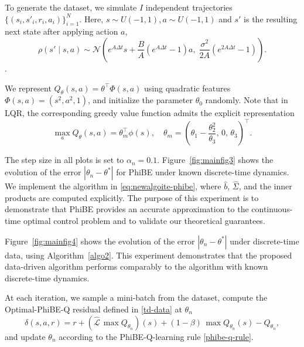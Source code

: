 \documentclass[12pt]{article}
\def\th{\theta}
\def\th{\theta}
\begin{document}
To generate the dataset, we simulate $I$ independent trajectories $\{(s_i, s'_i, r_i,a_i)\}_{i=1}^N$.
Here, $s \sim U(-1,1), a \sim U(-1,1)$ and $s'$ is the resulting next state after applying action $a$,
\[
\rho(s' \mid s,a) \sim \mathcal{N}\!\left(e^{A \Delta t}s + \frac{B}{A}\!\left(e^{A \Delta t}-1\right)a,\; \frac{\sigma^2}{2A}\!\left(e^{2A \Delta t}-1\right)\right).
\].

We represent $Q_\th(s,a) = \th^\top \Phi(s,a)$ using quadratic features $\Phi(s,a) = (s^2, a^2, 1)$, and initialize the parameter $\theta_0$ randomly. Note that in LQR, the corresponding greedy value function admits the explicit representation
\[
\max_a Q_\theta(s,a)
=
\theta_m^\top \phi(s),\quad \theta_m
=
\left(
\theta_1-\frac{\theta_2^2}{\theta_3},
\,0,\,
\theta_3
\right)^\top.
\]



The step size in all plots is set to $\alpha_n = 0.1$. Figure~\ref{fig:mainfig3} shows the evolution of the error $|\theta_n - \theta^*|$ for PhiBE under known discrete-time dynamics. We implement the algorithm in \eqref{eq:newalgoite-phibe}, where $\hat b$, $\hat \Sigma$, and the inner products are computed explicitly. The purpose of this experiment is to demonstrate that PhiBE provides an accurate approximation to the continuous-time optimal control problem and to validate our theoretical guarantees.

Figure~\ref{fig:mainfig4} shows the evolution of the error $|\theta_n - \theta^*|$ under discrete-time data, using Algorithm~\ref{algo2}. This experiment demonstrates that the proposed data-driven algorithm performs comparably to the algorithm with known discrete-time dynamics. 




At each iteration, we sample a mini-batch from the dataset, compute the Optimal-PhiBE-Q residual defined in \eqref{td-data} at $\th_n$
\[
\delta(s,a,r) = r + (\widehat{\mathcal{L}}\,\max Q_{\th_n})(s)
+ (1-\beta)\,\max Q_{\th_n}(s) - Q_{\th_n},
\]
and update $\theta_n$ according to the PhiBE-Q-learning rule \eqref{phibe-q-rule}. 
\end{document}
